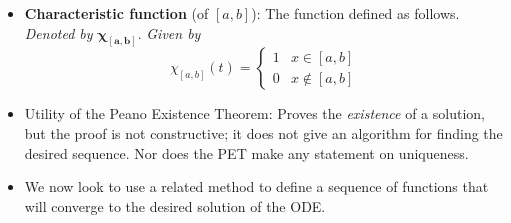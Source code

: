 \documentclass[../notes.tex]{subfiles}
\begin{document}
\begin{itemize}
\begin{proof}
        \emph{picture}
        We thus see that $y_0$ in the above equation corresponds to $y_m(t_0)=y(t_0)$, as we would expect. We see that we are summing a series of side-by-side integrals so that in the end, we integrate over all of $[t_0,t_0+T]$. We see that the characteristic function restricts us to integrating over the ODE only up until $t$, as we would want for an approximation $y_{m_k}(t)$ at $t$ using Euler's method. And we see that since $f(t_\alpha,y_{m_k}(t_\alpha))$ is constant and $h_m=t_{\alpha+1}-t_\alpha$, the integral does take on the expected value $f(t_\alpha,y_m(t_\alpha))h_m$. Moving right along, we see that
        \begin{align*}
            \left| y_{m_k}(t)-y_0-\int_{t_0}^tf(\tau,y_{m_k}(\tau))\dd\tau \right| &\leq \sum_{\alpha=0}^{m-1}\int_{t_\alpha}^{t_{\alpha+1}}\chi_t(\tau)|f(t_\alpha,y_{m_k}(t_\alpha))-f(\tau,y_{m_k}(\tau))|\dd\tau\\
            &< \int_{t_0}^{t_0+T}\chi_t(\tau)\cdot\frac{\varepsilon}{T}\dd\tau\\
            &= \int_{t_0}^t\frac{\varepsilon}{T}\dd\tau\\
            &= \varepsilon\cdot\frac{t-t_0}{T}\\
            &\leq \varepsilon
        \end{align*}
        Thus, by uniform convergence, $\int_{t_0}^tf(\tau,y_{m_k}(\tau))\dd\tau\to\int_{t_0}^tf(\tau,y(\tau))\dd\tau$ uniformly, so $y$ does satisfy the integral equation, as desired.
    \end{proof}
    \item \textbf{Characteristic function} (of $[a,b]$): The function defined as follows. \emph{Denoted by} $\bm{\chi_{[a,b]}}$. \emph{Given by}
    \begin{equation*}
        \chi_{[a,b]}(t) =
        \begin{cases}
            1 & x\in[a,b]\\
            0 & x\notin[a,b]
        \end{cases}
    \end{equation*}
    \item Utility of the Peano Existence Theorem: Proves the \emph{existence} of a solution, but the proof is not constructive; it does not give an algorithm for finding the desired sequence. Nor does the PET make any statement on uniqueness.
    \item We now look to use a related method to define a sequence of functions that will converge to the desired solution of the ODE.

\end{itemize}
\end{document}
